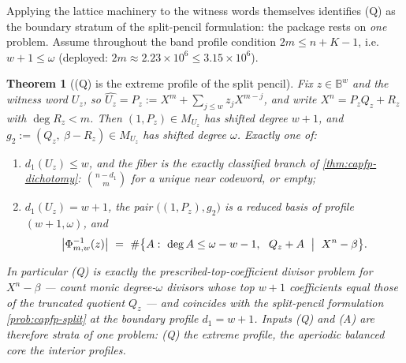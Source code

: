 \documentclass[11pt]{article}
\newtheorem{theorem}{Theorem}[section]
\theoremstyle{definition}
\theoremstyle{remark}
\newcommand{\B}{\mathbb{B}}
\begin{document}
Applying the lattice machinery to the witness words themselves identifies \textup{(Q)} as the boundary stratum of the split-pencil formulation: the package rests on \emph{one} problem.  Assume throughout the band profile condition $2m\le n+K-1$, i.e.\ $w+1\le\omega$ \textup(deployed: $2m\approx2.23\times10^6\le3.15\times10^6$\textup).

\begin{theorem}[\textup{(Q)} is the extreme profile of the split pencil]\label{thm:capfp-Q-unify}
Fix $z\in\B^w$ and the witness word $U_z$, so $\widehat{U_z}=P_z:=X^m+\sum_{j\le w}z_jX^{m-j}$, and write $X^n=P_zQ_z+R_z$ with $\deg R_z<m$.  Then $(1,P_z)\in M_{U_z}$ has shifted degree $w+1$, and $g_2:=(Q_z,\ \beta-R_z)\in M_{U_z}$ has shifted degree $\omega$.  Exactly one of:
\begin{enumerate}[label=\textup{(\roman*)}]
\item $d_1(U_z)\le w$, and the fiber is the exactly classified branch of \cref{thm:capfp-dichotomy}: $\binom{n-d_1}m$ for a unique near codeword, or empty;
\item $d_1(U_z)=w+1$, the pair $\bigl((1,P_z),g_2\bigr)$ is a reduced basis of profile $(w+1,\omega)$, and
\[
        \bigl|\Phi_{m,w}^{-1}(z)\bigr|\ =\ \#\bigl\{A:\ \deg A\le\omega-w-1,\ \ Q_z+A\ \bigm|\ X^n-\beta\bigr\}.
\]
\end{enumerate}
In particular \textup{(Q)} is exactly the prescribed-top-coefficient divisor problem for $X^n-\beta$ --- count monic degree-$\omega$ divisors whose top $w+1$ coefficients equal those of the truncated quotient $Q_z$ --- and coincides with the split-pencil formulation \cref{prob:capfp-split} at the boundary profile $d_1=w+1$.  Inputs \textup{(Q)} and \textup{(A)} are therefore strata of one problem: \textup{(Q)} the extreme profile, the aperiodic balanced core the interior profiles.
\end{theorem}
\end{document}
